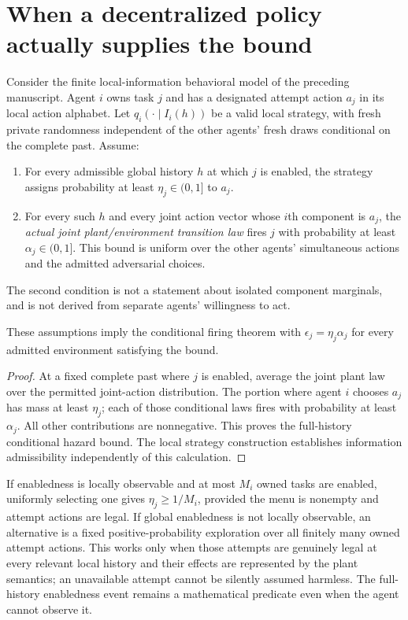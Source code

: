 \documentclass[11pt]{article}
\begin{document}
\section{When a decentralized policy actually supplies the bound}
Consider the finite local-information behavioral model of the preceding manuscript. Agent $i$ owns task $j$ and has a designated attempt action $a_j$ in its local action alphabet. Let $q_i(\cdot\mid I_i(h))$ be a valid local strategy, with fresh private randomness independent of the other agents' fresh draws conditional on the complete past. Assume:
\begin{enumerate}
\item For every admissible global history $h$ at which $j$ is enabled, the strategy assigns probability at least $\eta_j\in(0,1]$ to $a_j$.
\item For every such $h$ and every joint action vector whose $i$th component is $a_j$, the \emph{actual joint plant/environment transition law} fires $j$ with probability at least $\alpha_j\in(0,1]$. This bound is uniform over the other agents' simultaneous actions and the admitted adversarial choices.
\end{enumerate}
The second condition is not a statement about isolated component marginals, and is not derived from separate agents' willingness to act.

\begin{proposition}
These assumptions imply the conditional firing theorem with $\epsilon_j=\eta_j\alpha_j$ for every admitted environment satisfying the bound.
\end{proposition}
\begin{proof}
At a fixed complete past where $j$ is enabled, average the joint plant law over the permitted joint-action distribution. The portion where agent $i$ chooses $a_j$ has mass at least $\eta_j$; each of those conditional laws fires with probability at least $\alpha_j$. All other contributions are nonnegative. This proves the full-history conditional hazard bound. The local strategy construction establishes information admissibility independently of this calculation.
\end{proof}

If enabledness is locally observable and at most $M_i$ owned tasks are enabled, uniformly selecting one gives $\eta_j\ge1/M_i$, provided the menu is nonempty and attempt actions are legal. If global enabledness is not locally observable, an alternative is a fixed positive-probability exploration over all finitely many owned attempt actions. This works only when those attempts are genuinely legal at every relevant local history and their effects are represented by the plant semantics; an unavailable attempt cannot be silently assumed harmless. The full-history enabledness event remains a mathematical predicate even when the agent cannot observe it.
\end{document}

